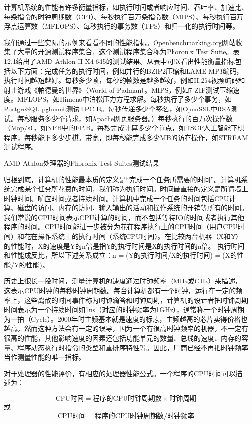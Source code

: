 \documentclass[]{ctexbook}
\begin{document}
计算机系统的性能有许多衡量指标，如执行时间或者响应时间、吞吐率、加速比、每条指令的时钟周期数（CPI）、每秒执行百万条指令数（MIPS）、每秒执行百万浮点运算数（MFLOPS）、每秒执行的事务数（TPS）和归一化的执行时间等。

我们通过一些实际的示例来看看不同的性能指标。Openbenchmarking.org网站收集了大量的开源测试程序集合，这个测试程序集合称为Phoronix Test Suite。表12.1给出了AMD Athlon II X4 645的测试结果。从表中可以看出性能衡量指标包括以下方面：完成任务的执行时间，例如并行的BZIP2压缩和LAME MP3编码，执行时间越短越好。每秒多少帧，每秒的帧数是越多越好，例如H.264视频编码和射击游戏《帕德曼的世界》（World of Padman）。MIPS，例如7-ZIP测试压缩速度。MFLOPS，如Himeno中泊松压力方程求解。每秒执行了多少个事务，如PostgreSQL pgbench测试TPC-B。每秒传递多少个签名，如OpenSSL中RSA测试。每秒服务多少个请求，如Apache网页服务器。）每秒执行的百万次操作数（Mop/s），如NPB中的EP.B。每秒完成计算多少个节点，如TSCP人工智能下棋程序，每秒能下多少步棋。带宽，即每秒能完成多少MB的访存操作，如STREAM测试程序。

\label{tab:AMDTest}AMD Athlon处理器的Phoronix Test Suites测试结果

归根到底，计算机的性能最本质的定义是``完成一个任务所需要的时间''。计算机系统完成某个任务所花费的时间，我们称为执行时间。时间最直接的定义是所谓墙上时钟时间、响应时间或者持续时间。计算机中完成一个任务的时间包括CPU计算、磁盘的访问、内存的访问、输入输出的活动和操作系统的开销等所有的时间。我们常说的CPU时间表示CPU计算的时间，而不包括等待IO的时间或者执行其他程序的时间。CPU时间能进一步被分为花在程序执行上的CPU时间（用户CPU时间）和花在操作系统上的执行时间（系统CPU时间）。在比较两台机器（X和Y）的性能时，X的速度是Y的n倍是指Y的执行时间是X的执行时间的n倍。 执行时间和性能成反比，所以下述关系成立：n = (Y的执行时间/X的执行时间) = (X的性能/Y的性能)。

历史上很长一段时间，测量计算机的速度通过时钟频率（MHz或GHz）来描述，这表示CPU时钟的每秒时钟周期数。每台计算机都有一个时钟，运行在一定的频率上，这些离散的时间事件称为时钟滴答和时钟周期，计算机的设计者把时钟周期时间表示为一个持续时间如1ns（对应的时钟频率为1GHz），通常称一个时钟周期为一拍（Cycle）。2000年时主频基本就是速度的标志，主频越高的芯片卖得价格也越高。然而这种方法会有一定的误导，因为一个有很高时钟频率的机器，不一定有很高的性能，其他影响速度的因素还包括功能单元的数量、总线的速度、内存的容量、程序动态执行时指令的类型和重排序特性等。因此，厂商已经不再把时钟频率当作测量性能的唯一指标。

对于处理器的性能评价，有相应的处理器性能公式。一个程序的CPU时间可以描述为：

\[
\mbox{CPU时间}=\mbox{程序的CPU时钟周期数}\times\mbox{时钟周期}
\]
或
\[
\mbox{CPU时间}=\mbox{程序的CPU时钟周期数}/\mbox{时钟频率}
\]
\end{document}
